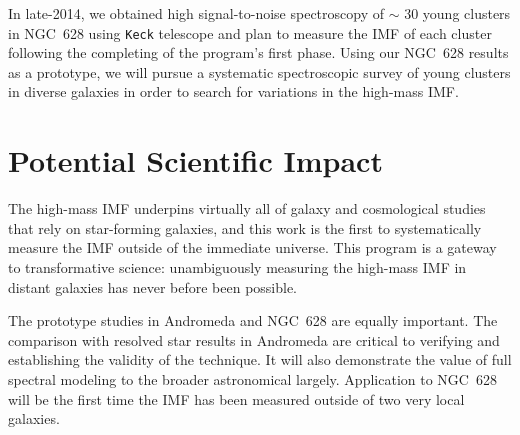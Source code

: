 \documentclass[11pt,preprint]{aastex}
\begin{document}
In late-2014, we obtained high signal-to-noise spectroscopy of $\sim$ 30 young clusters in NGC~628 using \texttt{Keck} telescope and plan to measure the IMF of each cluster following the completing of the program's first phase.  Using our NGC~628 results as a prototype, we will pursue a systematic spectroscopic survey of young clusters in diverse galaxies in order to search for variations in the high-mass IMF.

%


\section{Potential Scientific Impact}

The high-mass IMF underpins virtually all of galaxy and cosmological studies that rely on star-forming galaxies, and this work is the first to systematically measure the IMF outside of the immediate universe.  This program is a gateway to transformative science: unambiguously measuring the high-mass IMF in distant galaxies has never before been possible.

The prototype studies in Andromeda and NGC~628 are equally important. The comparison with resolved star results in Andromeda are critical to verifying and establishing the validity of the technique.  It will also demonstrate the value of full spectral modeling to the broader astronomical largely.  Application to NGC~628 will be the first time the IMF has been measured outside of two very local galaxies. 
\end{document}
